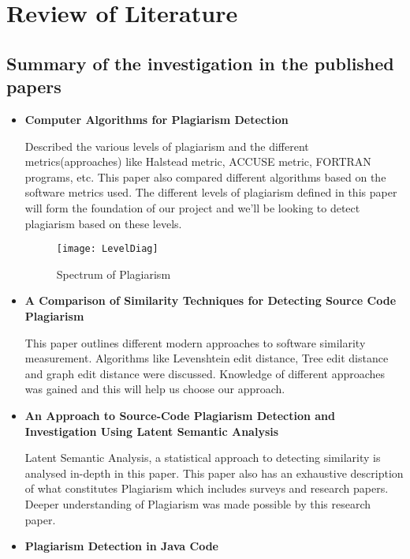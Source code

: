 				\chapter{Review of Literature }
				\section{Summary of the investigation in the published papers}
				
				\begin{itemize}
				\item \textbf{Computer Algorithms for Plagiarism Detection}
				
				Described the various levels of plagiarism and the different metrics(approaches) like Halstead metric, ACCUSE metric, FORTRAN programs, etc. This paper also compared different algorithms based on the software metrics used. The different levels of plagiarism defined in this paper will form the foundation of our project and we’ll be looking to detect plagiarism based on these levels.
				
				
				
				\begin{figure}[h]	
				\centering			
					\texttt{[image: LevelDiag]}
	  				\label{fig:Level1}
	  				\caption{Spectrum of Plagiarism}
					\end{figure}
				
				
				\pagebreak
				
				\item \textbf{A Comparison of Similarity Techniques for Detecting Source Code Plagiarism}
				
				This paper outlines different modern approaches to software similarity measurement. Algorithms like Levenshtein edit distance, Tree edit distance and graph edit distance were discussed. Knowledge of different approaches was gained and this will help us choose our approach.
				
				\item  \textbf{An Approach to Source-Code Plagiarism Detection and Investigation Using Latent Semantic Analysis}
				
				Latent Semantic Analysis, a statistical approach to detecting similarity is analysed in-depth in this paper. This paper also has an exhaustive description of what constitutes Plagiarism which includes surveys and research papers. Deeper understanding of Plagiarism was made possible by this research paper.
				
				\item  \textbf{Plagiarism Detection in Java Code}
				

\end{itemize}
